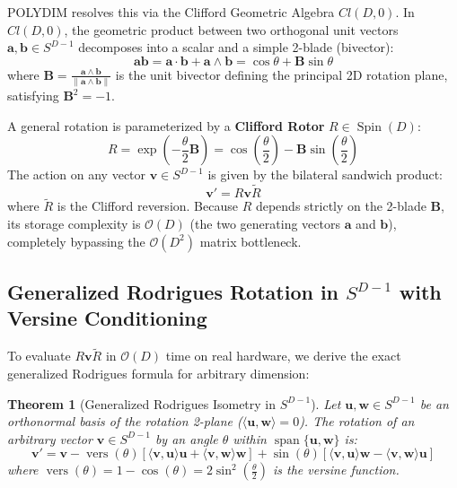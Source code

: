 \documentclass[11pt,twoside,a4paper]{article}
\theoremstyle{plain}
\newtheorem{theorem}{Theorem}[section]
\theoremstyle{definition}
\theoremstyle{remark}
\newcommand{\vers}{\operatorname{vers}}
\begin{document}
POLYDIM resolves this via the Clifford Geometric Algebra $Cl(D, 0)$. In $Cl(D, 0)$, the geometric product between two orthogonal unit vectors $\mathbf{a}, \mathbf{b} \in S^{D-1}$ decomposes into a scalar and a simple 2-blade (bivector):
\begin{equation}
\mathbf{a}\mathbf{b} = \mathbf{a} \cdot \mathbf{b} + \mathbf{a} \wedge \mathbf{b} = \cos \theta + \mathbf{B} \sin \theta
\end{equation}
where $\mathbf{B} = \frac{\mathbf{a} \wedge \mathbf{b}}{\|\mathbf{a} \wedge \mathbf{b}\|}$ is the unit bivector defining the principal 2D rotation plane, satisfying $\mathbf{B}^2 = -1$.

A general rotation is parameterized by a \textbf{Clifford Rotor} $R \in \operatorname{Spin}(D)$:
\begin{equation}
R = \exp\left( -\frac{\theta}{2} \mathbf{B} \right) = \cos\left(\frac{\theta}{2}\right) - \mathbf{B} \sin\left(\frac{\theta}{2}\right)
\end{equation}
The action on any vector $\mathbf{v} \in S^{D-1}$ is given by the bilateral sandwich product:
\begin{equation}
\mathbf{v}' = R \mathbf{v} \widetilde{R}
\end{equation}
where $\widetilde{R}$ is the Clifford reversion. Because $R$ depends strictly on the 2-blade $\mathbf{B}$, its storage complexity is $\mathcal{O}(D)$ (the two generating vectors $\mathbf{a}$ and $\mathbf{b}$), completely bypassing the $\mathcal{O}(D^2)$ matrix bottleneck.

\subsection{Generalized Rodrigues Rotation in $S^{D-1}$ with Versine Conditioning}

To evaluate $R \mathbf{v} \widetilde{R}$ in $\mathcal{O}(D)$ time on real hardware, we derive the exact generalized Rodrigues formula for arbitrary dimension:

\begin{theorem}[Generalized Rodrigues Isometry in $S^{D-1}$]
Let $\mathbf{u}, \mathbf{w} \in S^{D-1}$ be an orthonormal basis of the rotation 2-plane ($\langle \mathbf{u}, \mathbf{w} \rangle = 0$). The rotation of an arbitrary vector $\mathbf{v} \in S^{D-1}$ by an angle $\theta$ within $\operatorname{span}\{\mathbf{u}, \mathbf{w}\}$ is:
\begin{equation}
\mathbf{v}' = \mathbf{v} - \vers(\theta) \left[ \langle \mathbf{v}, \mathbf{u} \rangle \mathbf{u} + \langle \mathbf{v}, \mathbf{w} \rangle \mathbf{w} \right] + \sin(\theta) \left[ \langle \mathbf{v}, \mathbf{u} \rangle \mathbf{w} - \langle \mathbf{v}, \mathbf{w} \rangle \mathbf{u} \right]

\end{equation}
where $\vers(\theta) = 1 - \cos(\theta) = 2 \sin^2\left(\frac{\theta}{2}\right)$ is the \textit{versine function}.
\end{theorem}
\end{document}
